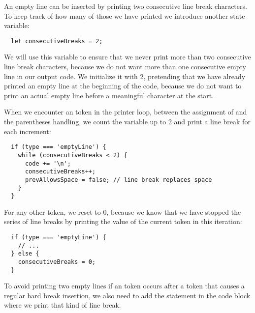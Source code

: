 An empty line can be inserted by
printing two consecutive line break characters.
To keep track of how many of those we have printed
we introduce another state variable:
\begin{verbatim}
  let consecutiveBreaks = 2;
\end{verbatim}
We will use this variable to ensure that we never print
more than two consecutive line break characters,
because we do not want
more than one consecutive empty line
in our output code.
We initialize it with 2,
pretending that we have already printed an empty line
at the beginning of the code,
because we do not want to print an actual empty line
before a meaningful character at the start.

When we encounter an  token in the printer loop,
between the assignment of 
and the parentheses handling,
we count the variable  up to 2
and print a line break for each increment:
\begin{verbatim}
  if (type === 'emptyLine') {
    while (consecutiveBreaks < 2) {
      code += '\n';
      consecutiveBreaks++;
      prevAllowsSpace = false; // line break replaces space
    }
  }
\end{verbatim}
For any other token,
we reset  to 0,
because we know that we have stopped the series of line breaks
by printing the value of the current token in this iteration:
\begin{verbatim}
  if (type === 'emptyLine') {
    // ...
  } else {
    consecutiveBreaks = 0;
  }
\end{verbatim}

To avoid printing two empty lines if an  token
occurs after a  token
that causes a regular hard break insertion,
we also need to add the statement 
in the code block where we print that kind of line break.

